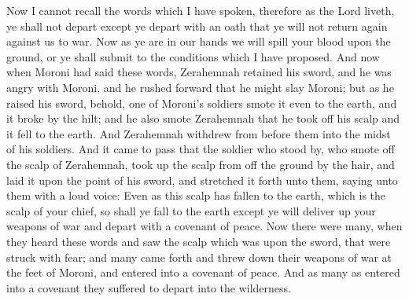 Now I cannot recall the words which I have spoken, therefore as the Lord liveth, ye shall not depart except ye depart with an oath that ye will not return again against us to war. Now as ye are in our hands we will spill your blood upon the ground, or ye shall submit to the conditions which I have proposed.
\bverse \iffalse And now when Moroni had said these words, Zerahemnah retained his sword, and he was angry with Moroni, and he rushed forward that he might slay Moroni; but as he raised his sword, behold, one of Moroni's soldiers smote it even to the earth, and it broke by the hilt; and he also smote Zerahemnah that he took off his scalp and it fell to the earth. And Zerahemnah withdrew from before them into the midst of his soldiers. \fi
And now when Moroni had said these words, Zerahemnah retained his sword, and he was angry with Moroni, and he rushed forward that he might slay Moroni; but as he raised his sword, behold, one of Moroni's soldiers smote it even to the earth, and it broke by the hilt; and he also smote Zerahemnah that he took off his scalp and it fell to the earth. And Zerahemnah withdrew from before them into the midst of his soldiers.
\bverse \iffalse And it came to pass that the soldier who stood by, who smote off the scalp of Zerahemnah, took up the scalp from off the ground by the hair, and laid it upon the point of his sword, and stretched it forth unto them, saying unto them with a loud voice: \fi
And it came to pass that the soldier who stood by, who smote off the scalp of Zerahemnah, took up the scalp from off the ground by the hair, and laid it upon the point of his sword, and stretched it forth unto them, saying unto them with a loud voice:
\bverse \iffalse Even as this scalp has fallen to the earth, which is the scalp of your chief, so shall ye fall to the earth except ye will deliver up your weapons of war and depart with a covenant of peace. \fi
Even as this scalp has fallen to the earth, which is the scalp of your chief, so shall ye fall to the earth except ye will deliver up your weapons of war and depart with a covenant of peace.
\bverse \iffalse Now there were many, when they heard these words and saw the scalp which was upon the sword, that were struck with fear; and many came forth and threw down their weapons of war at the feet of Moroni, and entered into a covenant of peace. And as many as entered into a covenant they suffered to depart into the wilderness. \fi
Now there were many, when they heard these words and saw the scalp which was upon the sword, that were struck with fear; and many came forth and threw down their weapons of war at the feet of Moroni, and entered into a covenant of peace. And as many as entered into a covenant they suffered to depart into the wilderness.

